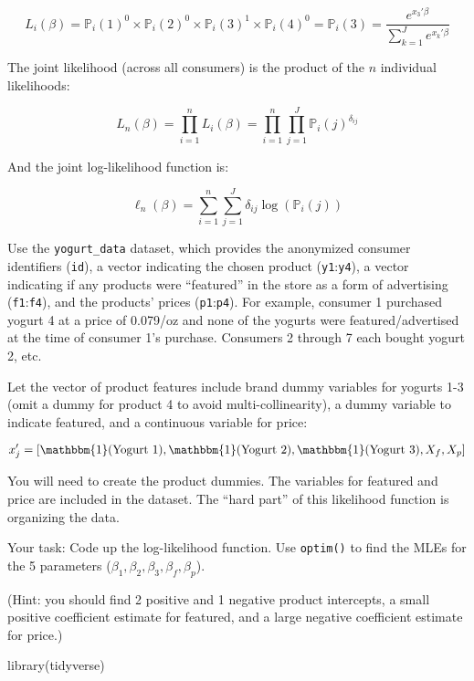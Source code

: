 \documentclass[
  letterpaper,
  DIV=11,
  numbers=noendperiod]{scrartcl}
\newenvironment{Shaded}{\begin{snugshade}}{\end{snugshade}}
\newcommand{\FunctionTok}[1]{\textcolor[rgb]{0.28,0.35,0.67}{#1}}
\newcommand{\NormalTok}[1]{\textcolor[rgb]{0.00,0.23,0.31}{#1}}
\begin{document}
\[ L_i(\beta) = \mathbb{P}_i(1)^0 \times \mathbb{P}_i(2)^0 \times \mathbb{P}_i(3)^1 \times \mathbb{P}_i(4)^0 = \mathbb{P}_i(3) = \frac{e^{x_3'\beta}}{\sum_{k=1}^Je^{x_k'\beta}} \]

The joint likelihood (across all consumers) is the product of the \(n\)
individual likelihoods:

\[ L_n(\beta) = \prod_{i=1}^n L_i(\beta) = \prod_{i=1}^n \prod_{j=1}^J \mathbb{P}_i(j)^{\delta_{ij}} \]

And the joint log-likelihood function is:

\[ \ell_n(\beta) = \sum_{i=1}^n \sum_{j=1}^J \delta_{ij} \log(\mathbb{P}_i(j)) \]

Use the \texttt{yogurt\_data} dataset, which provides the anonymized
consumer identifiers (\texttt{id}), a vector indicating the chosen
product (\texttt{y1}:\texttt{y4}), a vector indicating if any products
were ``featured'' in the store as a form of advertising
(\texttt{f1}:\texttt{f4}), and the products' prices
(\texttt{p1}:\texttt{p4}). For example, consumer 1 purchased yogurt 4 at
a price of 0.079/oz and none of the yogurts were featured/advertised at
the time of consumer 1's purchase. Consumers 2 through 7 each bought
yogurt 2, etc.

Let the vector of product features include brand dummy variables for
yogurts 1-3 (omit a dummy for product 4 to avoid multi-collinearity), a
dummy variable to indicate featured, and a continuous variable for
price:

\[ x_j' = [\mathbbm{1}(\text{Yogurt 1}), \mathbbm{1}(\text{Yogurt 2}), \mathbbm{1}(\text{Yogurt 3}), X_f, X_p] \]

You will need to create the product dummies. The variables for featured
and price are included in the dataset. The ``hard part'' of this
likelihood function is organizing the data.

Your task: Code up the log-likelihood function. Use \texttt{optim()} to
find the MLEs for the 5 parameters
(\(\beta_1, \beta_2, \beta_3, \beta_f, \beta_p\)).

(Hint: you should find 2 positive and 1 negative product intercepts, a
small positive coefficient estimate for featured, and a large negative
coefficient estimate for price.)

\begin{Shaded}
\begin{Highlighting}[]
\FunctionTok{library}\NormalTok{(tidyverse)}
\end{Highlighting}
\end{Shaded}
\end{document}
